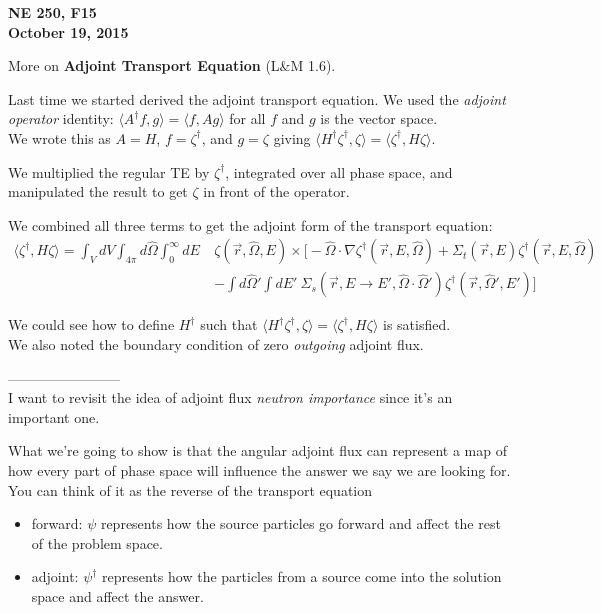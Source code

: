 \documentclass[12pt]{article}
\newcommand{\rvec}{\ensuremath{\vec{r}}}
\newcommand{\vOmega}{\ensuremath{\hat{\Omega}}}
\begin{document}
\begin{center}
{\bf NE 250, F15\\
October 19, 2015 
}
\end{center}

More on \textbf{Adjoint Transport Equation} (L\&M 1.6).

Last time we started derived the adjoint transport equation. We used the \textit{adjoint operator} identity: $\langle A^{\dagger}f, g\rangle = \langle f, Ag\rangle$ for all $f$ and $g$ is the vector space. \\
We wrote this as $A=H$, $f=\zeta^{\dagger}$, and $g=\zeta$ giving $\langle H^{\dagger} \zeta^{\dagger}, \zeta\rangle = \langle\zeta^{\dagger}, H \zeta\rangle$.

We multiplied the regular TE by $\zeta^{\dagger}$, integrated over all phase space, and manipulated the result to get $\zeta$ in front of the operator.

We combined all three terms to get the adjoint form of the transport equation:
\begin{align*}
\langle\zeta^{\dagger}, H \zeta\rangle = \int_{V} dV \int_{4\pi} d\vOmega \int_0^{\infty} dE \: &\zeta (\rvec, \vOmega, E) \times \biggl[-\vOmega \cdot \nabla \zeta^{\dagger}(\vec{r}, E, \vOmega)  + \Sigma_t(\rvec,E) \zeta^{\dagger}(\vec{r}, E, \vOmega) \\&- \int d\vOmega' \int dE'\: \Sigma_s(\rvec, E \rightarrow E', \vOmega \cdot \vOmega') \zeta^{\dagger}(\rvec, \vOmega', E') \biggr]
\end{align*}

We could see how to define $H^{\dagger}$ such that  $\langle H^{\dagger} \zeta^{\dagger}, \zeta\rangle = \langle\zeta^{\dagger}, H \zeta\rangle$ is satisfied.\\
We also noted the boundary condition of zero \textit{outgoing} adjoint flux.

------------------------\\
I want to revisit the idea of adjoint flux \textit{neutron importance} since it's an important one. 

What we're going to show is that the angular adjoint flux can represent a map of how every part of phase space will influence the answer we say we are looking for. You can think of it as the reverse of the transport equation 
\begin{itemize}
\item forward: $\psi$ represents how the source particles go forward and affect the rest of the problem space.
\item adjoint: $\psi^{\dagger}$ represents how the particles from a source come into the solution space and affect the answer. 
\end{itemize}
\end{document}
